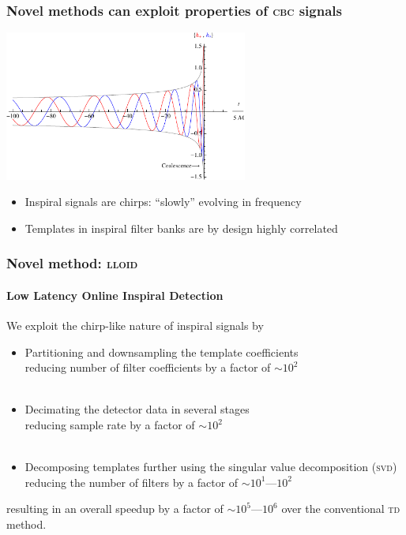 \documentclass{beamer}
\begin{document}
\begin{frame}
	\frametitle{Novel methods can exploit properties of \textsc{cbc} signals}
	\begin{center}
		\includegraphics[width=8cm]{figures/inspiral-waveform}
	\end{center}
	\begin{itemize}
		\item Inspiral signals are chirps: ``slowly'' evolving in frequency
		\item Templates in inspiral filter banks are by design highly correlated
	\end{itemize}
\end{frame}

\begin{frame}
	\frametitle{Novel method: \textsc{lloid}}
	\framesubtitle{Low Latency Online Inspiral Detection}

	We exploit the chirp-like nature of inspiral signals by

	\begin{itemize}
		\item Partitioning and downsampling the template coefficients \\ \footnotesize{reducing number of filter coefficients by a factor of {\color{ink3}$\sim 10^2$}} \\~\\

		\item Decimating the detector data in several stages \\ \footnotesize{reducing sample rate by a factor of {\color{ink3}$\sim 10^2$}} \\~\\

		\item Decomposing templates further using the singular value decomposition (\textsc{svd})
		\footnotesize{reducing the number of filters by a factor of {\color{ink3}$\sim 10^1 \textrm{---} 10^2$}}
	\end{itemize}

	resulting in an overall speedup by a factor of {\color{ink3}$\sim 10^5 \textrm{---} 10^6$} over the conventional \textsc{td} method.
\end{frame}
\end{document}
